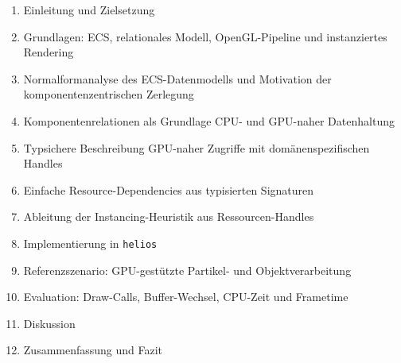 \begin{enumerate}
    \item Einleitung und Zielsetzung
    \item Grundlagen: ECS, relationales Modell, OpenGL-Pipeline und instanziertes Rendering
    \item Normalformanalyse des ECS-Datenmodells und Motivation der komponentenzentrischen Zerlegung
    \item Komponentenrelationen als Grundlage CPU- und GPU-naher Datenhaltung
    \item Typsichere Beschreibung GPU-naher Zugriffe mit domänenspezifischen Handles
    \item Einfache Resource-Dependencies aus typisierten Signaturen
    \item Ableitung der Instancing-Heuristik aus Ressourcen-Handles
    \item Implementierung in \texttt{helios}
    \item Referenzszenario: GPU-gestützte Partikel- und Objektverarbeitung
    \item Evaluation: Draw-Calls, Buffer-Wechsel, CPU-Zeit und Frametime
    \item Diskussion
    \item Zusammenfassung und Fazit
\end{enumerate}